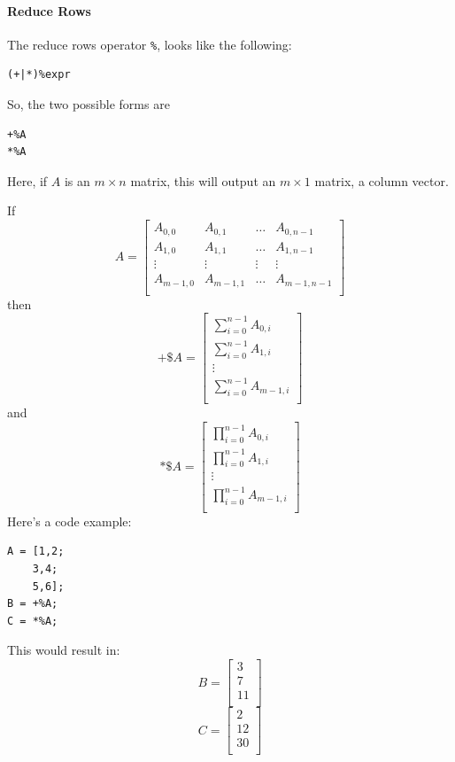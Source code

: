 \paragraph{Reduce Rows}
The reduce rows operator \verb=%=,  looks like the following:
\begin{lstlisting}
(+|*)%expr
\end{lstlisting}
So, the two possible forms are
\begin{lstlisting}
+%A
*%A
\end{lstlisting}
Here, if $A$ is an $m\times n$ matrix, this will output an $m \times 1$ matrix, a column vector.

If $$A=\begin{bmatrix}
A_{0,0} & A_{0,1} & \dots & A_{0,n-1}\\
A_{1,0} & A_{1,1} & \dots & A_{1,n-1}\\
\vdots&\vdots&\vdots&\vdots\\
A_{m-1,0} & A_{m-1,1} & \dots & A_{m-1,n-1}\\
\end{bmatrix}$$
then
$$+\$A=\begin{bmatrix}
\sum_{i=0}^{n-1} A_{0, i}\\
\sum_{i=0}^{n-1} A_{1, i}\\
\vdots\\
\sum_{i=0}^{n-1} A_{m-1, i}\\
\end{bmatrix}$$
and
$$*\$A=\begin{bmatrix}
\prod_{i=0}^{n-1} A_{0, i}\\
\prod_{i=0}^{n-1} A_{1, i}\\
\vdots\\
\prod_{i=0}^{n-1} A_{m-1, i}\\
\end{bmatrix}$$
Here's a code example:
\begin{lstlisting}
A = [1,2;
    3,4;
    5,6];
B = +%A;
C = *%A;
\end{lstlisting}
This would result in:
$$B=\begin{bmatrix}
3\\
7\\
11\\
\end{bmatrix}$$
$$C=\begin{bmatrix}
2\\
12\\
30\\
\end{bmatrix}$$


